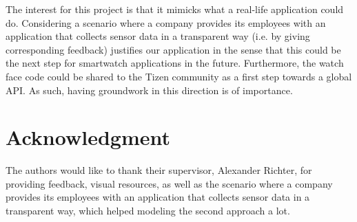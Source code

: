 \documentclass[conference, a4paper, 10pt, twocolumn]{IEEEtran}
\begin{document}
The interest for this project is that it mimicks what a real-life application could do. Considering a scenario where a company provides its employees with an application that collects sensor data in a transparent way (i.e. by giving corresponding feedback) justifies our application in the sense that this could be the next step for smartwatch applications in the future. Furthermore, the watch face code could be shared to the Tizen community as a first step towards a global \ac{API}. As such, having groundwork in this direction is of importance.

\section*{Acknowledgment}
The authors would like to thank their supervisor, Alexander Richter, for providing feedback, visual resources, as well as the scenario where a company provides its employees with an application that collects sensor data in a transparent way, which helped modeling the second approach a lot.

\printbibliography
\end{document}
